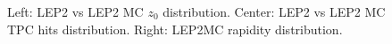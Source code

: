 \begin{figure}[H]
\centering
{}\hfill
{}\hfill %
\hfill %
\caption{Left: LEP2 vs LEP2 MC $z_0$ distribution. Center: LEP2 vs LEP2 MC TPC hits distribution. Right: LEP2MC rapidity distribution.}
\end{figure}

